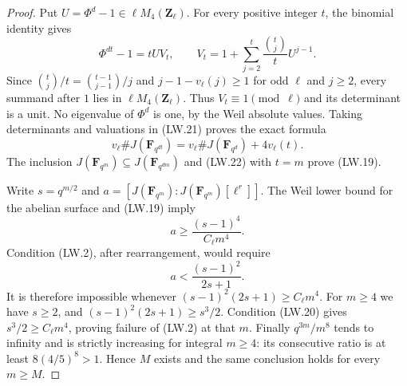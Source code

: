 \begin{proof}
Put $U=\Phi^d-1\in\ell M_4(\mathbf Z_\ell)$.
For every positive integer $t$, the binomial identity gives
\[
 \Phi^{dt}-1=tU V_t,\qquad
 V_t=1+\sum_{j=2}^t\frac{\binom tj}{t}U^{j-1}.
 \tag{LW.21}
\]
Since
$\binom tj/t=\binom{t-1}{j-1}/j$ and
$j-1-v_\ell(j)\ge1$ for odd $\ell$ and $j\ge2$,
every summand after $1$ lies in $\ell M_4(\mathbf Z_\ell)$.
Thus $V_t\equiv1\pmod\ell$ and its determinant is a unit.
No eigenvalue of $\Phi^d$ is one, by the Weil absolute values.
Taking determinants and valuations in (LW.21) proves the exact formula
\[
 v_\ell\#J(\mathbf F_{q^{dt}})
   =v_\ell\#J(\mathbf F_{q^d})+4v_\ell(t).
 \tag{LW.22}
\]
The inclusion
$J(\mathbf F_{q^m})\subseteq J(\mathbf F_{q^{dm}})$
and (LW.22) with $t=m$ prove (LW.19).

Write $s=q^{m/2}$ and
$a=[J(\mathbf F_{q^m}):J(\mathbf F_{q^m})[\ell^r]]$.
The Weil lower bound for the abelian surface and (LW.19) imply
\[
                     a\ge\frac{(s-1)^4}{C_\ell m^4}.
 \tag{LW.23}
\]
Condition (LW.2), after rearrangement, would require
\[
                        a<\frac{(s-1)^2}{2s+1}.
 \tag{LW.24}
\]
It is therefore impossible whenever
$(s-1)^2(2s+1)\ge C_\ell m^4$.
For $m\ge4$ we have $s\ge2$, and
$(s-1)^2(2s+1)\ge s^3/2$.
Condition (LW.20) gives $s^3/2\ge C_\ell m^4$,
proving failure of (LW.2) at that $m$.
Finally $q^{3m}/m^8$ tends to infinity and is strictly increasing
for integral $m\ge4$: its consecutive ratio is at least
$8(4/5)^8>1$.  Hence $M$ exists and the same conclusion holds
for every $m\ge M$.
\end{proof}

